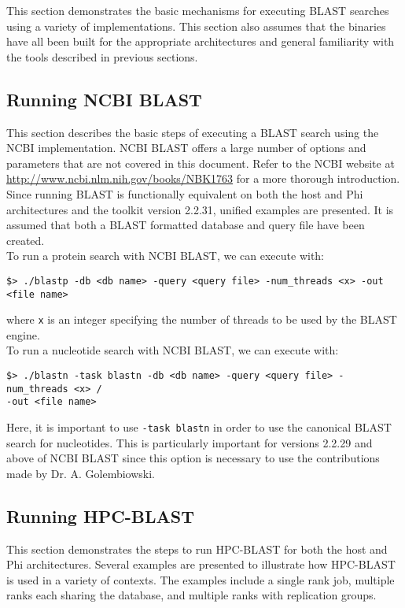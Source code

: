 \documentclass[10pt]{article}
\begin{document}
This section demonstrates the basic mechanisms for executing BLAST searches using a variety of implementations.  This section also assumes that the binaries have all been built for the appropriate architectures and general familiarity with the tools described
in previous sections.

\subsection{Running NCBI BLAST} \label{ssec:runncbi}

This section describes the basic steps of executing a BLAST search using the NCBI implementation.  NCBI BLAST offers a large number of options and parameters that are not covered in this document. Refer to the NCBI website
at \url{http://www.ncbi.nlm.nih.gov/books/NBK1763} for a more thorough introduction.  Since running BLAST is functionally equivalent on both the host and Phi architectures and the toolkit version 2.2.31, unified examples are presented.
It is assumed that both a BLAST formatted database and query file have been created.\\

\noindent To run a protein search with NCBI BLAST, we can execute with:
\begin{verbatim}
$> ./blastp -db <db name> -query <query file> -num_threads <x> -out <file name>
\end{verbatim}
\noindent where \verb^x^ is an integer specifying the number of threads to be used by the BLAST engine.\\

\noindent To run a nucleotide search with NCBI BLAST, we can execute with:
\begin{verbatim}
$> ./blastn -task blastn -db <db name> -query <query file> -num_threads <x> /
-out <file name>
\end{verbatim}
\noindent Here, it is important to use \verb^-task blastn^ in order to use the canonical BLAST search for nucleotides.  This is particularly important for versions 2.2.29 and above of NCBI BLAST since this option is necessary to use the contributions made
by Dr. A. Golembiowski.

\subsection{Running HPC-BLAST} \label{ssec:runhpc}

This section demonstrates the steps to run HPC-BLAST for both the host and Phi architectures.  Several examples are presented to illustrate how HPC-BLAST is used in a variety of contexts. The examples include a single rank job, multiple ranks
each sharing the database, and multiple ranks with replication groups.
\end{document}
